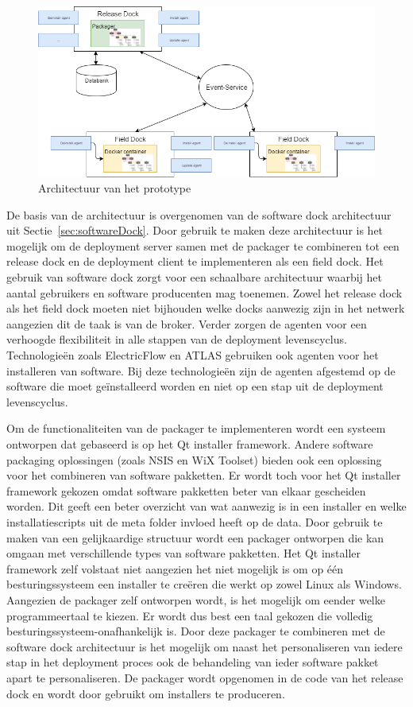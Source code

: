 \begin{figure}
\includegraphics[width=\textwidth,height=\textheight,keepaspectratio]{afbeelding/architectuur.png}
\centering
\caption{Architectuur van het prototype}
\label{fig:architectuur}
\end{figure}

De basis van de architectuur is overgenomen van de software dock architectuur uit Sectie~\ref{sec:softwareDock}.
Door gebruik te maken deze architectuur is het mogelijk om de deployment server samen met de packager te combineren tot een release dock en de deployment client te implementeren als een field dock. 
Het gebruik van software dock zorgt voor een schaalbare architectuur waarbij het aantal gebruikers en software producenten mag toenemen.
Zowel het release dock als het field dock moeten niet bijhouden welke docks aanwezig zijn in het netwerk aangezien dit de taak is van de broker.
Verder zorgen de agenten voor een verhoogde flexibiliteit in alle stappen van de deployment levenscyclus.
Technologieën zoals ElectricFlow en ATLAS gebruiken ook agenten voor het installeren van software.
Bij deze technologieën zijn de agenten afgestemd op de software die moet geïnstalleerd worden en niet op een stap uit de deployment levenscyclus.

Om de functionaliteiten van de packager te implementeren wordt een systeem ontworpen dat gebaseerd is op het Qt installer framework.
Andere software packaging oplossingen (zoals NSIS en WiX Toolset) bieden ook een oplossing voor het combineren van software pakketten.
Er wordt toch voor het Qt installer framework gekozen omdat software pakketten beter van elkaar gescheiden worden.
Dit geeft een beter overzicht van wat aanwezig is in een installer en welke installatiescripts uit de meta folder invloed heeft op de data.
Door gebruik te maken van een gelijkaardige structuur wordt een packager ontworpen die kan omgaan met verschillende types van software pakketten.
Het Qt installer framework zelf volstaat niet aangezien het niet mogelijk is om op één besturingssysteem een installer te creëren die werkt op zowel Linux als Windows.
Aangezien de packager zelf ontworpen wordt, is het mogelijk om eender welke programmeertaal te kiezen.
Er wordt dus best een taal gekozen die volledig besturingssysteem-onafhankelijk is.
Door deze packager te combineren met de software dock architectuur is het mogelijk om naast het personaliseren van iedere stap in het deployment proces ook de behandeling van ieder software pakket apart te personaliseren.
De packager wordt opgenomen in de code van het release dock en wordt door gebruikt om installers te produceren.

